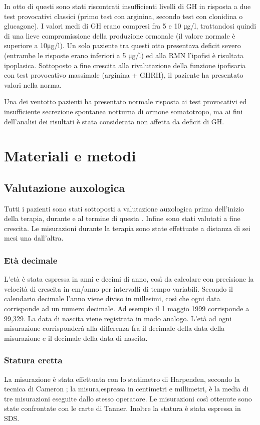 In otto di questi sono stati riscontrati insufficienti livelli di GH in risposta a due test provocativi classici (primo test con arginina, secondo test con clonidina o glucagone). I valori medi di GH erano compresi fra 5 e 10 \unit{\micro g}/l, trattandosi quindi di una lieve compromissione della produzione ormonale (il valore normale è superiore a 10\unit{\micro g}/l). Un solo paziente tra questi otto presentava deficit severo (entrambe le risposte erano inferiori a 5 \unit{\micro g}/l) ed alla RMN l'ipofisi è risultata ipoplasica. Sottoposto a fine crescita alla rivalutazione della funzione ipofisaria con test provocativo massimale (arginina + GHRH), il paziente ha presentato valori nella norma.

 Una dei ventotto pazienti ha presentato normale risposta ai test provocativi ed insufficiente secrezione spontanea notturna di ormone somatotropo, ma ai fini dell'analisi dei risultati è stata considerata non affetta da deficit di GH.

\section{Materiali e metodi}

\subsection{Valutazione auxologica}
Tutti i pazienti sono stati sottoposti a valutazione auxologica prima dell'inizio della terapia, durante e al termine di questa . Infine sono stati valutati a fine crescita. Le misurazioni durante la terapia sono state effettuate a distanza di sei mesi una dall'altra.

\subsubsection*{Età decimale}
L'età è stata espressa in anni e decimi di anno, così da calcolare con precisione la velocità di crescita in cm/anno per intervalli di tempo variabili. Secondo il calendario decimale l'anno viene diviso in millesimi, così che ogni data corrisponde ad un numero decimale. Ad esempio il 1 maggio 1999 corrisponde a 99,329. La data di nascita viene registrata in modo analogo. L'età ad ogni misurazione corrisponderà alla differenza fra il decimale della data della misurazione e il decimale della data di nascita\cite{tanner1990foetus}.    


\subsubsection*{Statura eretta}
 La misurazione è stata effettuata con lo statimetro di Harpenden, secondo la tecnica di Cameron\cite{cameron1984measurement}
; la misura,espressa in centimetri e millimetri, è la media di tre misurazioni eseguite dallo stesso operatore. Le misurazioni così ottenute sono state confrontate con le carte di Tanner\cite{tanner1966standards}.
Inoltre la statura è stata espressa in SDS.

